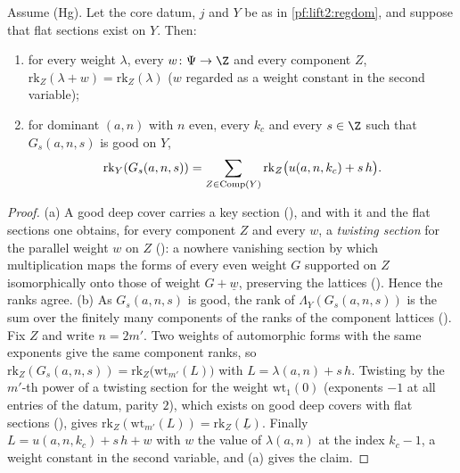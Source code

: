 \begin{proposition}\label{pf:lift2:twistrank}
Assume \textup{(Hg)}. Let the core datum, $j$ and $Y$ be as in \cref{pf:lift2:regdom}, and suppose that flat sections exist
on $Y$. Then:
\begin{enumerate}[label=(\alph*)]
\item for every weight $\lambda$, every $w\colon\Psi\to\Z$ and every component $Z$,
$\mathrm{rk}_Z(\lambda+w)=\mathrm{rk}_Z(\lambda)$ ($w$ regarded as a weight constant in the second variable);
\item for dominant $(a,n)$ with $n$ even, every $k_c$ and every $s\in\Z$ such that $G_s(a,n,s)$ is good on $Y$,
\[
\operatorname{rk}_Y(G_s(a,n,s))=\sum_{Z\in\operatorname{Comp}(Y)}\mathrm{rk}_Z\bigl(u(a,n,k_c)+s\,h\bigr).
\]
\end{enumerate}
\end{proposition}

\begin{proof}
(a) A good deep cover carries a key section (), and with it and
the flat sections one obtains, for every component $Z$ and every $w$, a \emph{twisting section} for the parallel weight $w$
on $Z$ (): a nowhere vanishing section by which multiplication maps the
forms of every even weight $G$ supported on $Z$ isomorphically onto those of weight $G+\underline w$, preserving the
lattices (). Hence the ranks agree.
(b) As $G_s(a,n,s)$ is good, the rank of $\Lambda_Y(G_s(a,n,s))$ is the sum over the finitely many components of the
ranks of the component lattices (). Fix $Z$ and write
$n=2m'$. Two weights of automorphic forms with the same exponents give the same component ranks, so
$\mathrm{rk}_Z(G_s(a,n,s))=\mathrm{rk}_Z\bigl(\mathrm{wt}_{m'}(L)\bigr)$ with $L=\lambda(a,n)+s\,h$. Twisting by the $m'$-th power
of a twisting section for the weight $\mathrm{wt}_1(0)$ (exponents $-1$ at all entries of the datum, parity $2$), which exists
on good deep covers with flat sections (), gives
$\mathrm{rk}_Z(\mathrm{wt}_{m'}(L))=\mathrm{rk}_Z(\underline L)$. Finally $L=u(a,n,k_c)+s\,h+w$ with $w$ the value of $\lambda(a,n)$ at
the index $k_c-1$, a weight constant in the second variable, and (a) gives the claim.
\end{proof}

